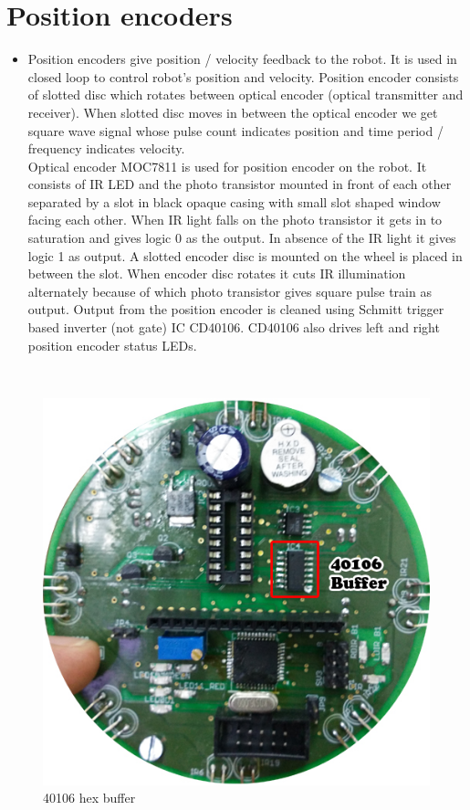 \documentclass[a4paper,12pt,oneside]{book}
\begin{document}
	\chapter{Position encoders}
	\begin{itemize}
	\item {Position encoders give position / velocity feedback to the robot. It is used in closed loop to
		control robot’s position and velocity. Position encoder consists of slotted disc which rotates
		between optical encoder (optical transmitter and receiver). When slotted disc moves in between
		the optical encoder we get square wave signal whose pulse count indicates position and time
		period / frequency indicates velocity.\\
		Optical encoder MOC7811 is used for position encoder on the robot. It consists of IR LED and
		the photo transistor mounted in front of each other separated by a slot in black opaque casing
		with small slot shaped window facing each other. When IR light falls on the photo transistor it
		gets in to saturation and gives logic 0 as the output. In absence of the IR light it gives logic 1 as
		output. A slotted encoder disc is mounted on the wheel is placed in between the slot. When
		encoder disc rotates it cuts IR illumination alternately because of which photo transistor gives
		square pulse train as output. Output from the position encoder is cleaned using Schmitt trigger
		based inverter (not gate) IC CD40106. CD40106 also drives left and right position encoder status
		LEDs.
	}
	\end{itemize}

	\hfill\\
	\begin{figure}[h!]
		\caption{40106 hex buffer}
		\includegraphics[width=\textwidth]{./HardwareManual/40106_buffer.jpg}
	\end{figure}
\end{document}
